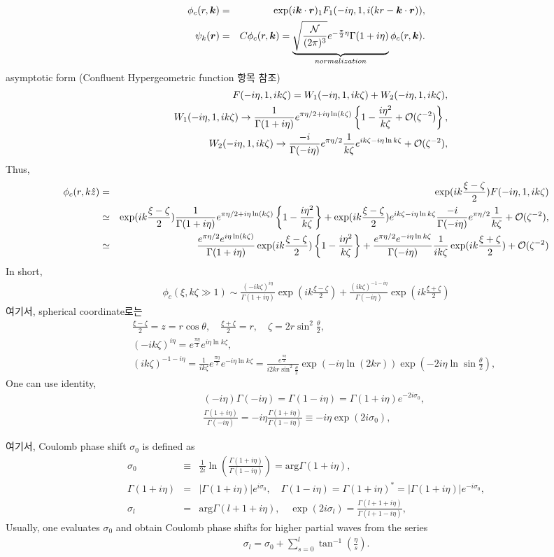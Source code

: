 \documentclass[10pt]{book}
\def\bm{\boldsymbol}
\newcommand{\bea}{\begin{eqnarray}}
\newcommand{\eea}{\end{eqnarray}}
\newcommand{\no}{\nonumber \\}
\def\vk{{\bm k}}
\def\vr{{\bm r}}
\begin{document}
\bea 
\phi_c(r,\vk)&=&\exp(i\vk\cdot\vr)
                  {}_1F_1(-i\eta,1, i(kr-\vk\cdot\vr)),\no  
\psi_k(\vr)&=&C \phi_c(r,\vk)=
\underbrace{\sqrt{\frac{\cal N}{(2\pi)^3}}
e^{-\frac{\pi}{2}\eta} \Gamma(1+i\eta) }_{normalization}\phi_c(r,\vk).                  
\eea
 asymptotic form  (Confluent Hypergeometric function 항목 참조)
\bea 
& &F(-i\eta,1,ik \zeta)=W_1(-i\eta,1,ik\zeta)+W_2( -i\eta,1,ik\zeta),\no 
& &W_1(-i\eta,1,ik\zeta)\rightarrow 
   \frac{1}{\Gamma(1+i\eta)}e^{\pi\eta/2+i\eta\ln(k\zeta)}
   \left\{ 1-\frac{i \eta^2 }{k\zeta}+{\cal O}(\zeta^{-2})\right\},\no 
& &W_2( -i\eta,1,ik\zeta)\rightarrow 
   \frac{-i}{\Gamma(-i\eta)}e^{\pi\eta/2}\frac{1}{k\zeta} 
   e^{ik\zeta-i\eta\ln k\zeta}+{\cal O}(\zeta^{-2}),
\eea  
Thus,
\bea 
\phi_c(r,k\hat{z})&=&\exp(ik\frac{\xi-\zeta}{2})
                  F(-i\eta,1, ik\zeta) \no 
      &\simeq&  \exp(ik\frac{\xi-\zeta}{2})\frac{1}{\Gamma(1+i\eta)}e^{\pi\eta/2+i\eta\ln(k\zeta)}
         \left\{ 1-\frac{i \eta^2 }{k\zeta}\right\} 
      + \exp(ik\frac{\xi-\zeta}{2})e^{ik\zeta-i\eta\ln k\zeta}
         \frac{-i}{\Gamma(-i\eta)}e^{\pi\eta/2}\frac{1}{k\zeta} 
         +{\cal O}(\zeta^{-2}), \no 
     &\simeq& \frac{e^{\pi\eta/2}e^{i\eta\ln(k\zeta)}}{\Gamma(1+i\eta)}\exp(ik\frac{\xi-\zeta}{2})
              \left\{ 1-\frac{i \eta^2 }{k\zeta}\right\}
           +\frac{e^{\pi\eta/2}e^{-i\eta\ln k\zeta}}{\Gamma(-i\eta)}\frac{1}{i k\zeta}       
           \exp(ik\frac{\xi+\zeta}{2})+{\cal O}(\zeta^{-2})
\eea  
In short,  
\bea
\phi_c(\xi,k\zeta\gg 1)\sim \frac{(-ik\zeta)^{i\eta}}{\Gamma(1+i\eta)}
\exp(ik\frac{\xi-\zeta}{2})+\frac{(ik\zeta)^{-1-i\eta}}{\Gamma(-i\eta)}
\exp(ik\frac{\xi+\zeta}{2})
\eea
여기서, spherical coordinate로는  
\bea
& &\frac{\xi-\zeta}{2}=z=r\cos\theta,\quad \frac{\xi+\zeta}{2}=r,
\quad \zeta=2 r \sin^2\frac{\theta}{2},\no
& &(-ik\zeta)^{i\eta}=e^{\frac{\pi\eta}{2}} e^{i\eta \ln k\zeta},
\no
& &(ik\zeta)^{-1-i\eta}=
   \frac{1}{ik\zeta} e^{\frac{\pi\eta}{2}}e^{-i\eta \ln k\zeta}
  =\frac{e^{\frac{\pi\eta}{2}}}{i2kr\sin^2\frac{\theta}{2}}
   \exp(-i\eta \ln (2kr))\exp(-2i\eta\ln \sin\frac{\theta}{2}) ,
\eea
One can use identity,
\bea 
& &(-i\eta)\Gamma(-i\eta)=\Gamma(1-i\eta)=\Gamma(1+i\eta)e^{-2i\sigma_0},\no 
& &\frac{\Gamma(1+i\eta)}{\Gamma(-i\eta)}
   =-i\eta\frac{\Gamma(1+i\eta)}{\Gamma(1-i\eta)}
   \equiv -i\eta \exp(2i\sigma_0),   
\eea 

여기서, Coulomb phase shift $\sigma_0$ is defined as
\bea
\sigma_0&\equiv&\frac{1}{2i}\ln\left(\frac{\Gamma(1+i\eta)}{\Gamma(1-i\eta)}\right)
  = \mbox{arg} \Gamma(1+i\eta),\no
\Gamma(1+i\eta)&=&|\Gamma(1+i\eta)| e^{i\sigma_0},
\quad \Gamma(1-i\eta)=\Gamma(1+i\eta)^*=|\Gamma(1+i\eta)| e^{-i\sigma_0} ,\no 
\sigma_l &=&\mbox{arg}\Gamma(l+1+i\eta),
\quad \exp(2i\sigma_l)=\frac{\Gamma(l+1+i\eta)}{\Gamma(l+1-i\eta)},
\eea
Usually, one evaluates $\sigma_0$ and obtain Coulomb phase shifts for higher
partial waves from the series
\bea 
\sigma_l=\sigma_0+\sum_{s=0}^l \tan^{-1}(\frac{\eta}{s}).
\eea 
\end{document}
